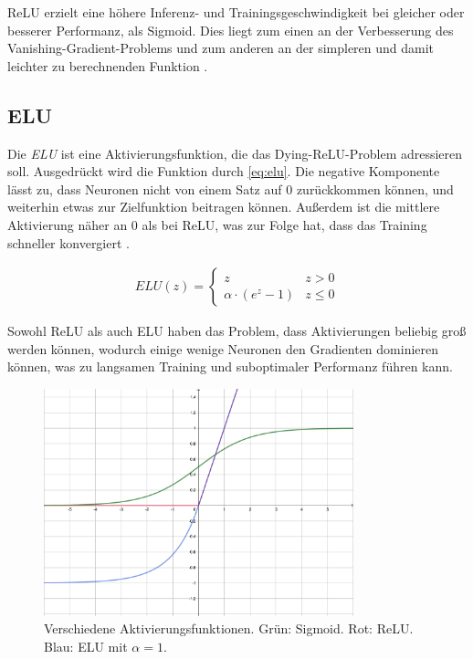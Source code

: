 \ac{ReLU} erzielt eine höhere Inferenz- und Trainingsgeschwindigkeit bei gleicher oder besserer Performanz, 
als Sigmoid. Dies liegt zum einen an der Verbesserung des Vanishing-Gradient-Problems und zum anderen an der 
simpleren und damit leichter zu berechnenden Funktion \cite[S.~226]{Goodfellow.2016}.

\subsection{\acf{ELU}}

Die \textit{\acf{ELU}} ist eine Aktivierungsfunktion, die das Dying-\ac{ReLU}-Problem adressieren soll. 
Ausgedrückt wird die Funktion durch \autoref{eq:elu}. Die negative Komponente lässt zu, dass Neuronen nicht 
von einem Satz auf $0$ zurückkommen können, und weiterhin etwas zur Zielfunktion beitragen können. Außerdem ist die mittlere 
Aktivierung näher an $0$ als bei \ac{ReLU}, was zur Folge hat, dass das Training schneller konvergiert \cite{Clevert.23112015}.

\begin{align}
	\label{eq:elu} ELU(z) = \begin{cases} 
		z & z > 0 \\
		\alpha \cdot (e^z - 1) & z \leq 0 
	\end{cases}
\end{align}

Sowohl \ac{ReLU} als auch \ac{ELU} haben das Problem, dass Aktivierungen beliebig groß werden können, 
wodurch einige wenige Neuronen den Gradienten dominieren können, was zu langsamen Training und suboptimaler Performanz führen kann. 
\begin{figure}
	\centering
	\includegraphics[width=0.8\textwidth]{Bilder/activation-geogebra-export.pdf} 
	\caption{Verschiedene Aktivierungsfunktionen. Grün: Sigmoid. Rot: \ac{ReLU}. Blau: \ac{ELU} mit $\alpha = 1$.}
	\label{fig:activation}
\end{figure} 


